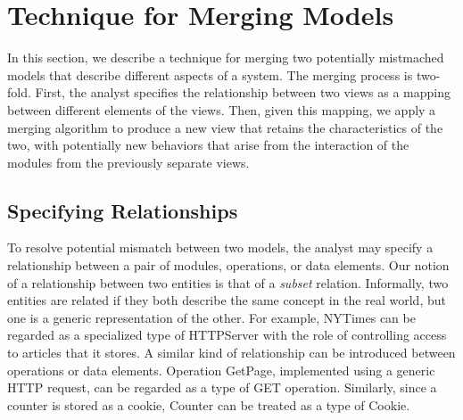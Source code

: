 
\section{Technique for Merging Models}
\label{sec-merging}

In this section, we describe a technique for merging two potentially
mistmached models that describe different aspects of a system. The
merging process is two-fold. First, the analyst specifies the
relationship between two views as a mapping between different elements
of the views. Then, given this mapping, we apply a merging algorithm
to produce a new view that retains the characteristics of the two,
with potentially new behaviors that arise from the interaction of the
modules from the previously separate views.

\subsection{Specifying Relationships}
\label{sec-relationship}

To resolve potential mismatch between two models, the analyst may
specify a relationship between a pair of modules, operations, or data
elements. Our notion of a relationship between two entities is that of
a \textit{subset} relation. Informally, two entities are related if
they both describe the same concept in the real world, but one is a
generic representation of the other. For example,
\textsf{NYTimes} can be regarded as a specialized type of
\textsf{HTTPServer} with the role of controlling access to articles
that it stores.  A similar kind of relationship can be introduced
between operations or data elements. Operation \textsf{GetPage},
implemented using a generic HTTP request, can be regarded as a type of
\textsf{GET} operation. Similarly, since a counter is stored as a
cookie, \textsf{Counter} can be treated as a type of \textsf{Cookie}.

